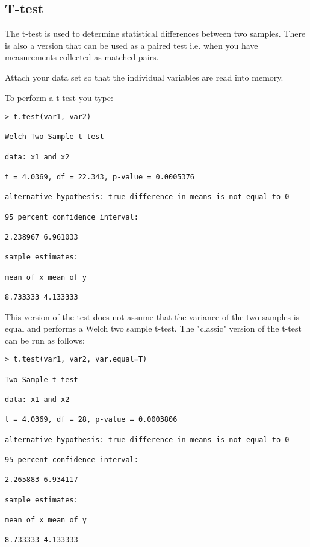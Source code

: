 


\subsection{T-test}

The t-test is used to determine statistical differences between two samples. There is also a version that can be used as a paired test i.e. when you have measurements collected as matched pairs.


Attach your data set so that the individual variables are read into memory.

To perform a t-test you type:

\begin{framed}
\begin{verbatim}
> t.test(var1, var2)

Welch Two Sample t-test

data: x1 and x2

t = 4.0369, df = 22.343, p-value = 0.0005376

alternative hypothesis: true difference in means is not equal to 0

95 percent confidence interval:

2.238967 6.961033

sample estimates:

mean of x mean of y

8.733333 4.133333

\end{verbatim}
\end{framed}

This version of the test does not assume that the variance of the two samples is equal and performs a Welch two sample t-test. The "classic" version of the t-test can be run as follows:

\begin{framed}
\begin{verbatim}
> t.test(var1, var2, var.equal=T)

Two Sample t-test

data: x1 and x2

t = 4.0369, df = 28, p-value = 0.0003806

alternative hypothesis: true difference in means is not equal to 0

95 percent confidence interval:

2.265883 6.934117

sample estimates:

mean of x mean of y

8.733333 4.133333

\end{verbatim}
\end{framed}


